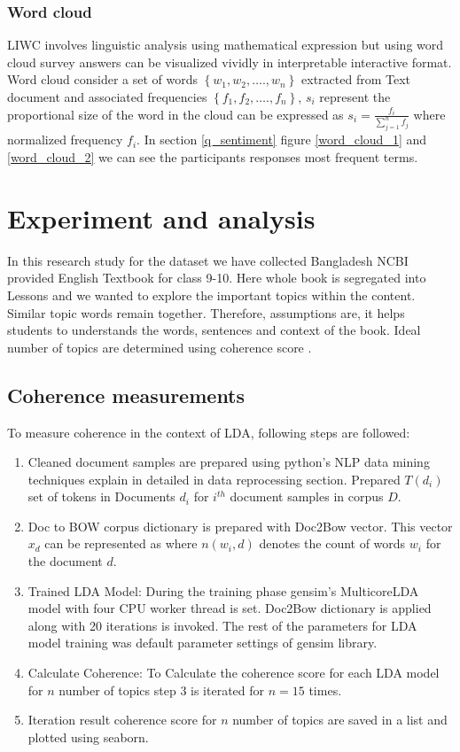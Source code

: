 \documentclass[sn-mathphys,Numbered]{sn-jnl}%
\theoremstyle{thmstyleone}%
\theoremstyle{thmstyletwo}%
\theoremstyle{thmstylethree}%
\begin{document}
\subsubsection{Word cloud}
\label{wordcloud}
LIWC involves linguistic analysis using mathematical expression but
using word cloud survey answers can be visualized vividly in
interpretable interactive format. Word cloud consider a set of words
\(\left\{ w_{1},w_{2},\ldots.,w_{n} \right\}\) extracted from Text
document and associated frequencies
\(\left\{ f_{1},f_{2},\ldots.,f_{n} \right\}\), \(s_{i}\) represent the
proportional size of the word in the cloud can be expressed as
\(s_{i} = \frac{f_{i}}{\sum_{j = 1}^{n}f_{j}}\) where normalized
frequency \(f_{i}\). In section \ref{q_sentiment} figure \ref{word_cloud_1} and \ref{word_cloud_2} we can see the participants responses most frequent terms. 

\section{Experiment and analysis}\label{exp_analysis}
In this research study for the dataset we have collected Bangladesh NCBI provided English Textbook for class 9-10. Here whole book is segregated into Lessons and we wanted to explore the important topics within the content. Similar topic words remain together. Therefore, assumptions are, it helps students to understands the words, sentences and context of the book. Ideal number of topics are determined using coherence score \cite{mimno2011optimizing}.

\subsection{Coherence measurements}\label{coh_measure}
To measure coherence in the context of LDA, following steps are
followed:

\begin{enumerate}[label=(\roman*)]
\item
  Cleaned document samples are prepared using python's NLP data mining
  techniques explain in detailed in data reprocessing section. Prepared
  \(T\left( d_{i} \right)\) set of tokens in Documents \(d_{i}\) for
  \(i^{th}\) document samples in corpus \(D\).
\item
  Doc to BOW corpus dictionary is prepared with Doc2Bow vector. This
  vector \(x_{d}\) can be represented as where
  \(n\left( w_{i},d \right)\) denotes the count of words \(w_{i}\) for
  the document \(d\).
\item
  Trained LDA Model: During the training phase gensim's MulticoreLDA
  model with four CPU worker thread is set. Doc2Bow dictionary is
  applied along with 20 iterations is invoked. The rest of the
  parameters for LDA model training was default parameter settings of
  gensim library.
\item
  Calculate Coherence: To Calculate the coherence score for each LDA
  model for \(n\) number of topics step 3 is iterated for \(n = 15\)
  times.
\item
  Iteration result coherence score for \(n\) number of topics are saved
  in a list and plotted using seaborn.
\end{enumerate}
\end{document}
